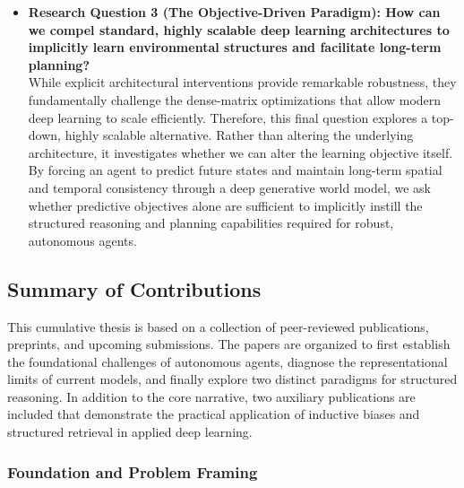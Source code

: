 \begin{itemize}
    \item \textbf{Research Question 3 (The Objective-Driven Paradigm): How can we compel standard, highly scalable deep learning architectures to implicitly learn environmental structures and facilitate long-term planning?}\\
    While explicit architectural interventions provide remarkable robustness, they fundamentally challenge the dense-matrix optimizations that allow modern deep learning to scale efficiently. Therefore, this final question explores a top-down, highly scalable alternative. Rather than altering the underlying architecture, it investigates whether we can alter the learning objective itself. By forcing an agent to predict future states and maintain long-term spatial and temporal consistency through a deep generative world model, we ask whether predictive objectives alone are sufficient to implicitly instill the structured reasoning and planning capabilities required for robust, autonomous agents.
\end{itemize}


\subsection{Summary of Contributions}

This cumulative thesis is based on a collection of peer-reviewed publications, preprints, and upcoming submissions. The papers are organized to first establish the foundational challenges of autonomous agents, diagnose the representational limits of current models, and finally explore two distinct paradigms for structured reasoning. In addition to the core narrative, two auxiliary publications are included that demonstrate the practical application of inductive biases and structured retrieval in applied deep learning.

\subsubsection{Foundation and Problem Framing}

